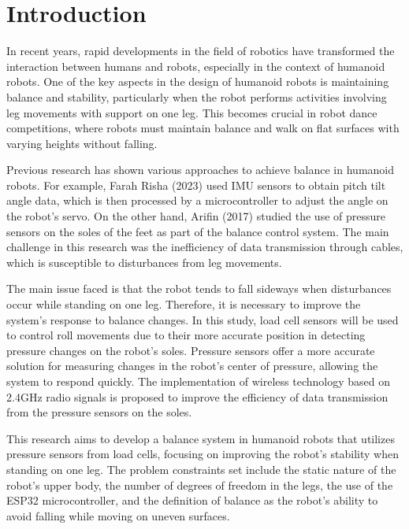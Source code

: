 \section{Introduction}
\label{sec:introduction}

In recent years, rapid developments in the field of robotics have transformed the interaction between humans and robots, especially in the context of humanoid robots\cite{chiang2020posture}. One of the key aspects in the design of humanoid robots is maintaining balance and stability, particularly when the robot performs activities involving leg movements with support on one leg. This becomes crucial in robot dance competitions, where robots must maintain balance and walk on flat surfaces with varying heights without falling.

Previous research has shown various approaches to achieve balance in humanoid robots. For example, Farah Risha (2023)\cite{farah} used IMU sensors to obtain pitch tilt angle data, which is then processed by a microcontroller to adjust the angle on the robot's servo. On the other hand, Arifin (2017)\cite{arifin2017implementasi} studied the use of pressure sensors on the soles of the feet as part of the balance control system. The main challenge in this research was the inefficiency of data transmission through cables, which is susceptible to disturbances from leg movements.

The main issue faced is that the robot tends to fall sideways when disturbances occur while standing on one leg. Therefore, it is necessary to improve the system's response to balance changes. In this study, load cell sensors will be used to control roll movements due to their more accurate position in detecting pressure changes on the robot's soles. Pressure sensors offer a more accurate solution for measuring changes in the robot's center of pressure, allowing the system to respond quickly. The implementation of wireless technology based on 2.4GHz radio signals is proposed to improve the efficiency of data transmission from the pressure sensors on the soles.

This research aims to develop a balance system in humanoid robots that utilizes pressure sensors from load cells, focusing on improving the robot's stability when standing on one leg. The problem constraints set include the static nature of the robot's upper body, the number of degrees of freedom in the legs, the use of the ESP32 microcontroller, and the definition of balance as the robot's ability to avoid falling while moving on uneven surfaces.
